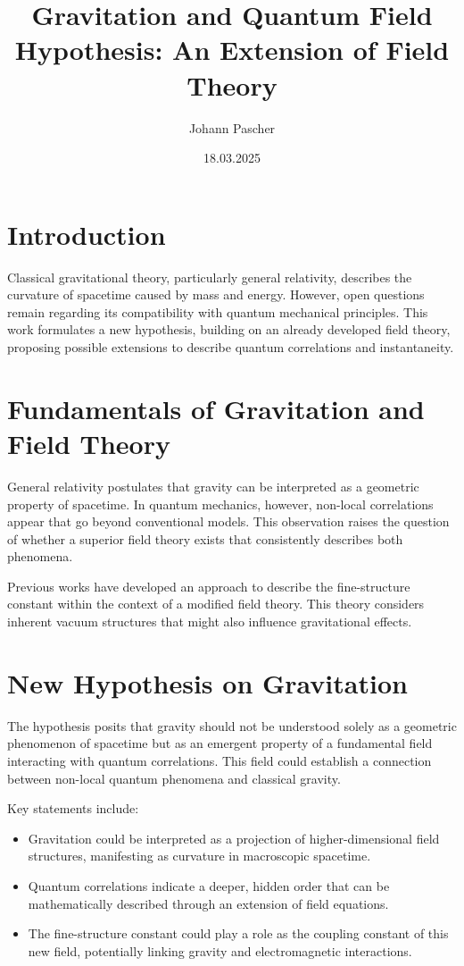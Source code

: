 \documentclass[a4paper,11pt]{article}
\title{Gravitation and Quantum Field Hypothesis: An Extension of Field Theory}
\author{Johann Pascher}
\date{18.03.2025}
\begin{document}
	
	\maketitle
	\tableofcontents
	\section{Introduction}
	Classical gravitational theory, particularly general relativity, describes the curvature of spacetime caused by mass and energy. However, open questions remain regarding its compatibility with quantum mechanical principles. This work formulates a new hypothesis, building on an already developed field theory, proposing possible extensions to describe quantum correlations and instantaneity.
	
	\section{Fundamentals of Gravitation and Field Theory}
	General relativity postulates that gravity can be interpreted as a geometric property of spacetime. In quantum mechanics, however, non-local correlations appear that go beyond conventional models. This observation raises the question of whether a superior field theory exists that consistently describes both phenomena.
	
	Previous works have developed an approach to describe the fine-structure constant within the context of a modified field theory. This theory considers inherent vacuum structures that might also influence gravitational effects.
	
	\section{New Hypothesis on Gravitation}
	The hypothesis posits that gravity should not be understood solely as a geometric phenomenon of spacetime but as an emergent property of a fundamental field interacting with quantum correlations. This field could establish a connection between non-local quantum phenomena and classical gravity.
	
	Key statements include:
	\begin{itemize}
		\item Gravitation could be interpreted as a projection of higher-dimensional field structures, manifesting as curvature in macroscopic spacetime.
		\item Quantum correlations indicate a deeper, hidden order that can be mathematically described through an extension of field equations.
		\item The fine-structure constant could play a role as the coupling constant of this new field, potentially linking gravity and electromagnetic interactions.
	\end{itemize}
	
\end{document}
